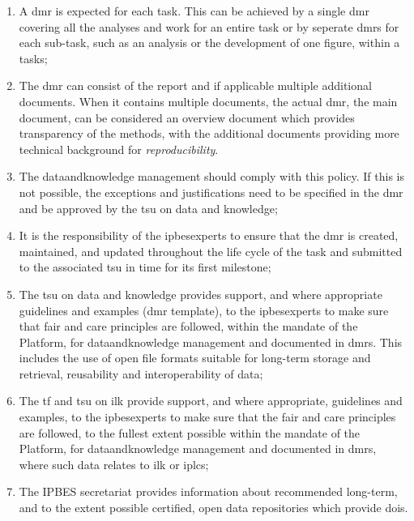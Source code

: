 \documentclass{article}
\begin{document}
\begin{enumerate}[label=(\alph*)]
    \item A \gls{dmr} is expected for each \gls{task}. This can be achieved by a single \gls{dmr} covering all the analyses and work for an entire \gls{task} or by seperate \glspl{dmr} for each sub-\gls{task}, such as an analysis or the development of one figure, within a \glspl{task};

    \item The \gls{dmr} can consist of the report and if applicable multiple additional documents. When it contains multiple documents, the actual \gls{dmr}, the main document, can be considered an overview document which provides transparency of the methods, with the additional documents providing more technical background for \textit{reproducibility}.

    \item The \gls{dataandknowledge} management should comply with this policy. If this is not possible, the exceptions and justifications need to be specified in the \gls{dmr} and be approved by the  \gls{tsu} on data and knowledge;

    \item It is the responsibility of the \glspl{ipbesexpert} to ensure that the \gls{dmr} is created, maintained, and updated throughout the life cycle of the \gls{task} and submitted to the associated \gls{tsu} in time for its first \gls{milestone};

    \item The  \gls{tsu} on \gls{data} and \gls{knowledge} provides support, and where appropriate guidelines and examples (\gls{dmr}  template), to the \glspl{ipbesexpert} to make sure that \gls{fair} and \gls{care} principles are followed, within the mandate of the Platform, for \gls{dataandknowledge} management and documented in \glspl{dmr}. This includes the use of open file formats suitable for long-term storage and retrieval, reusability and interoperability of \gls{data};

    \item The \gls{tf} and \gls{tsu} on \gls{ilk} provide support, and where appropriate, guidelines and examples, to the \glspl{ipbesexpert} to make sure that the \gls{fair} and \gls{care} principles are followed, to the fullest extent possible within the mandate of the Platform, for \gls{dataandknowledge} management and documented in \glspl{dmr}, where such \gls{data} relates to \gls{ilk} or \glspl{iplc};

    \item The IPBES \gls{secretariat} provides information about recommended long-term, and to the extent possible certified, open \gls{data} repositories which provide \glspl{doi}.
\end{enumerate}
\end{document}
